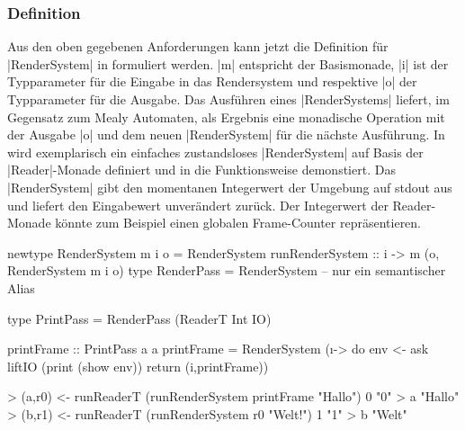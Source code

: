 
\subsubsection{Definition}

Aus den oben gegebenen Anforderungen kann jetzt die Definition für |RenderSystem| in  formuliert werden. |m| entspricht der Basismonade, |i| ist der Typparameter für die Eingabe in das Rendersystem und respektive |o| der Typparameter für die Ausgabe. Das Ausführen eines |RenderSystems| liefert, im Gegensatz zum Mealy Automaten, als Ergebnis eine monadische Operation mit der Ausgabe |o| und dem neuen |RenderSystem| für die nächste Ausführung. In  wird exemplarisch ein einfaches zustandsloses |RenderSystem| auf Basis der |Reader|-Monade definiert und in  die Funktionsweise demonstiert. Das |RenderSystem| gibt den momentanen Integerwert der Umgebung auf stdout aus und liefert den Eingabewert unverändert zurück. Der Integerwert der Reader-Monade könnte zum Beispiel einen globalen Frame-Counter repräsentieren.

\begin{haskell}[label={lst:definition-rendersystem},caption={Definition Rendersystem}]
newtype RenderSystem m i o = RenderSystem { runRenderSystem :: i -> m (o, RenderSystem m i o) }
type RenderPass = RenderSystem -- nur ein semantischer Alias
\end{haskell}

\begin{haskell}[label={lst:rendersystem-beispiel-reader},caption={Beispiel Rendersystem mit ReaderT IO als Basismonade}]
type PrintPass = RenderPass (ReaderT Int IO)

printFrame :: PrintPass a a
printFrame = RenderSystem (\i -> do
  env <- ask
  liftIO (print (show env))
  return (i,printFrame))
\end{haskell}

\begin{haskell}[label={lst:rendersystem-ausfuehrung-beispiel},caption={Ausführungsbeispiel Rendersystem}]
> (a,r0) <- runReaderT (runRenderSystem printFrame "Hallo") 0
"0"
> a
"Hallo"
> (b,r1) <- runReaderT (runRenderSystem r0 "Welt!") 1
"1"
> b
"Welt"
\end{haskell}

